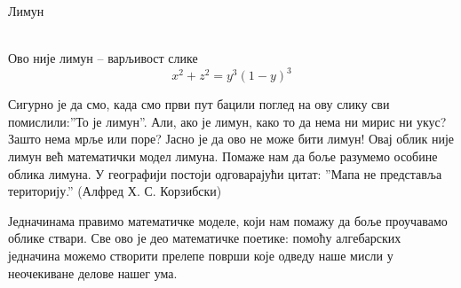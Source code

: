 \documentclass[en]{./../../common/SurferDesc}%
\begin{document}
\footnotesize

\begin{surferPage}
  \begin{surferTitle} Лимун\end{surferTitle}  \\ %
Ово није лимун – варљивост слике\\
\smallskip
\[x^2 + z^2 = y^3 (1 - y)^3\] 


\singlespacing
Сигурно је да смо, када смо први пут бацили поглед на ову слику сви помислили:''То је лимун''. Али, ако је лимун, како то да нема ни мирис ни укус? Зашто нема мрље или поре? Јасно је да ово не може бити лимун! 
\singlespacing
Овај облик није лимун већ математички модел лимуна. Помаже нам да боље разумемо особине облика лимуна. У географији постоји одговарајући цитат: ''Мапа не представља територију.'' (Алфред Х. С. Корзибски) \\
\singlespacing

Једначинама правимо математичке моделе, који нам помажу да боље проучавамо облике ствари. 
\singlespacing
Све ово је део математичке поетике: помоћу алгебарских једначина можемо створити прелепе површи које одведу наше мисли у неочекиване делове нашег ума. 



  \begin{surferText}
     \end{surferText}
\end{surferPage}
\end{document}
